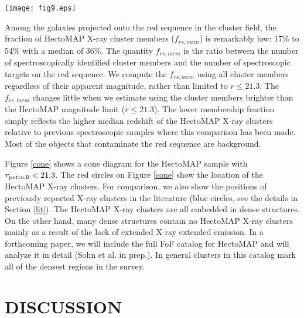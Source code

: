\documentclass[iop, apj]{emulateapj}
\begin{document}
\begin{figure*}
\centering
\texttt{[image: fig9.eps]}
\caption{Cone diagram for the HectoMAP region. 
Black dots indicate the HectoMAP red galaxies. 
Red circles show HectoMAP X-ray clusters.
Blue circles mark X-ray cluster candidates from the literature. }
\label{cone}
\end{figure*} 

Among the galaxies projected onto the red sequence in the cluster field, 
 the fraction of HectoMAP X-ray cluster members ($f_{rs, mem}$) is remarkably low: 
 17\% to 54\% with a median of 36\%.
The quantity $f_{rs, mem}$ is the ratio 
 between the number of spectroscopically identified cluster members and 
 the number of spectroscopic targets on the red sequence. 
We compute the $f_{rs, mem}$ using all cluster members regardless of their apparent magnitude, 
  rather than limited to $r \leq 21.3$. 
The $f_{rs, mem}$ changes little when we estimate using the cluster members brighter than the HectoMAP magnitude limit ($r \leq 21.3$). 
The lower membership fraction simply reflects 
 the higher median redshift of the HectoMAP X-ray clusters 
 relative to previous spectroscopic samples 
 where this comparison has been made. 
Most of the objects that contaminate the red sequence are background. 

Figure \ref{cone} shows a cone diagram for the HectoMAP sample
 with $r_{\rm petro, 0} < 21.3$. 
The red circles on Figure \ref{cone} 
 show the location of the HectoMAP X-ray clusters. 
For comparison, 
 we also show the positions of previously reported X-ray clusters in the literature 
 (blue circles, see the details in Section \ref{lit}). 
The HectoMAP X-ray clusters are all embedded in dense structures. 
On the other hand, 
 many dense structures contain no HectoMAP X-ray clusters 
 mainly as a result of the lack of extended X-ray extended emission. 
In a forthcoming paper, 
 we will include the full FoF catalog for HectoMAP and will analyze it in detail (Sohn et al. in prep.). 
In general clusters in this catalog mark all of the densest regions in the survey.

\section{DISCUSSION}\label{discussion}
\end{document}
